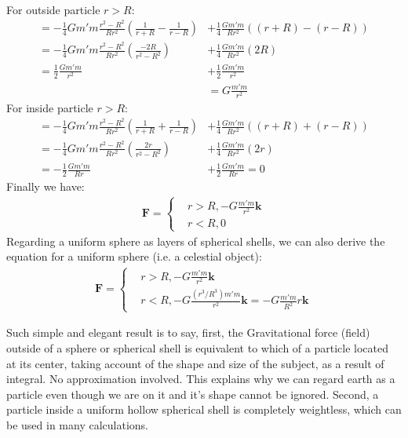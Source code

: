 \documentclass[11pt, a4paper, oneside]{book}
\numberwithin{equation}{section}%
\begin{document}
~\\
For outside particle $r>R$:
\begin{align}
	=-\frac{1}{4}Gm'm\frac{r^2-R^2}{Rr^2}
	\left(\frac{1}{r+R}-\frac{1}{r-R}\right) &+ 
	\frac{1}{4}\frac{Gm'm}{Rr^2}
	\left((r+R)-(r-R)\right)\\
	=-\frac{1}{4}Gm'm\frac{r^2-R^2}{Rr^2}
	\left(\frac{-2R}{r^2-R^2}\right) &+ 
	\frac{1}{4}\frac{Gm'm}{Rr^2}
	\left(2R\right)\\
	=\frac{1}{2}\frac{Gm'm}{r^2} &+ 
	\frac{1}{2}\frac{Gm'm}{r^2}\\
	&= G\frac{m'm}{r^2}
\end{align}
For inside particle $r>R$:
\begin{align}
=-\frac{1}{4}Gm'm\frac{r^2-R^2}{Rr^2}
\left(\frac{1}{r+R}+\frac{1}{r-R}\right) &+ 
\frac{1}{4}\frac{Gm'm}{Rr^2}
\left((r+R)+(r-R)\right)\\
=-\frac{1}{4}Gm'm\frac{r^2-R^2}{Rr^2}
\left(\frac{2r}{r^2-R^2}\right) &+ 
\frac{1}{4}\frac{Gm'm}{Rr^2}
\left(2r\right)\\
=-\frac{1}{2}\frac{Gm'm}{Rr} &+ 
\frac{1}{2}\frac{Gm'm}{Rr}=0
\end{align}
Finally we have:
\begin{align}
	\textbf{F}=\left\{
	\begin{aligned}
	&r>R,-G\frac{m'm}{r^2}\textbf{k}\\
	&r<R,0
	\end{aligned}
	\right.
\end{align}
Regarding a uniform sphere as layers of spherical shells, we can also derive the equation for a uniform sphere (i.e. a celestial object):
\begin{align}
	\textbf{F}=\left\{
	\begin{aligned}
	&r>R,-G\frac{m'm}{r^2}\textbf{k}\\
	&r<R,-G\frac{(r^3/R^3)m'm}{r^2}\textbf{k}=-G\frac{m'm}{R^2}r\textbf{k}
	\end{aligned}
	\right.
\end{align}

Such simple and elegant result is to say, first, the Gravitational force (field) outside of a sphere or spherical shell is equivalent to which of a particle located at its center, taking account of the shape and size of the subject, as a result of integral. No approximation involved. This explains why we can regard earth as a particle even though we are on it and it's shape cannot be ignored. Second, a particle inside a uniform hollow spherical shell is completely weightless, which can be used in many calculations.
\end{document}
